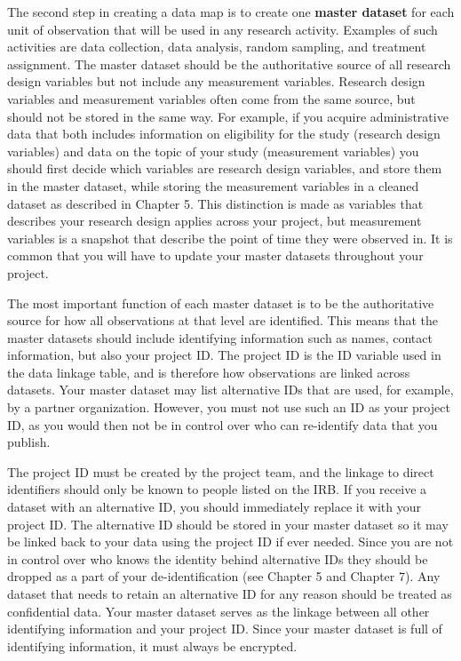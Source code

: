 The second step in creating a data map is to create one \textbf{master dataset}
for each unit of observation that will be used in any research activity.
Examples of such activities are data collection, data analysis,
random sampling, and treatment assignment.
The master dataset should be the authoritative source of
all research design variables
but not include any measurement variables.
Research design variables and measurement variables
often come from the same source,
but should not be stored in the same way.
For example, if you acquire administrative data that both includes
information on eligibility for the study (research design variables)
and data on the topic of your study (measurement variables)
you should first decide which variables are research design variables,
and store them in the master dataset,
while storing the measurement variables in a cleaned dataset
as described in Chapter 5.
This distinction is made as variables that 
describes your research design applies across your project,
but measurement variables is a snapshot 
that describe the point of time they were observed in.
It is common that you will have to update
your master datasets throughout your project.

The most important function of each master dataset
is to be the authoritative source
for how all observations at that level are identified.
This means that the master datasets should include
identifying information such as names, contact information,
but also your project ID.
The project ID is the ID variable used in the data linkage table,
and is therefore how observations are linked across datasets.
Your master dataset may list alternative IDs that are used,
for example, by a partner organization.
However, you must not use such an ID as your project ID,
as you would then not be in control over
who can re-identify data that you publish.

The project ID must be created by the project team,
and the linkage to direct identifiers
should only be known to people listed on the IRB.
If you receive a dataset with an alternative ID,
you should immediately replace it with your project ID.
The alternative ID should be stored in your master dataset
so it may be linked back to your data using the project ID if ever needed.
Since you are not in control over who knows the identity behind alternative IDs
they should be dropped as a part of your de-identification (see Chapter 5 and Chapter 7).
Any dataset that needs to retain an alternative ID for any reason
should be treated as confidential data.
Your master dataset serves as the linkage between
all other identifying information and your project ID.
Since your master dataset is full of identifying information,
it must always be encrypted.

